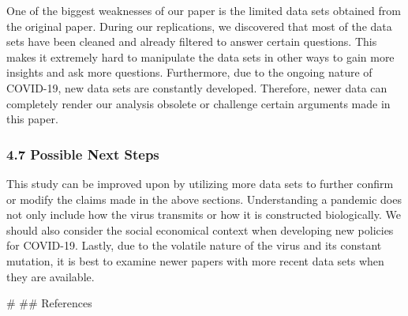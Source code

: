 \documentclass[
]{article}
\begin{document}
One of the biggest weaknesses of our paper is the limited data sets
obtained from the original paper. During our replications, we discovered
that most of the data sets have been cleaned and already filtered to
answer certain questions. This makes it extremely hard to manipulate the
data sets in other ways to gain more insights and ask more questions.
Furthermore, due to the ongoing nature of COVID-19, new data sets are
constantly developed. Therefore, newer data can completely render our
analysis obsolete or challenge certain arguments made in this paper.

\hypertarget{possible-next-steps}{%
\subsubsection{4.7 Possible Next Steps}\label{possible-next-steps}}

This study can be improved upon by utilizing more data sets to further
confirm or modify the claims made in the above sections. Understanding a
pandemic does not only include how the virus transmits or how it is
constructed biologically. We should also consider the social economical
context when developing new policies for COVID-19. Lastly, due to the
volatile nature of the virus and its constant mutation, it is best to
examine newer papers with more recent data sets when they are available.

\#\newpage{} \#\# References
\end{document}
